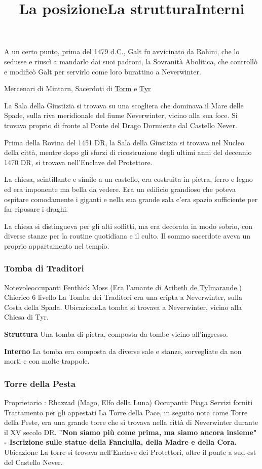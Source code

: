 \documentclass{article}
\begin{document}
A un certo punto, prima del 1479 d.C., Galt fu avvicinato da Rohini, che lo sedusse e riuscì a mandarlo dai suoi padroni, la Sovranità Abolitica, che controllò e modificò Galt per servirlo come loro burattino a Neverwinter.


Mercenari di Mintarn, Sacerdoti di \href{https://forgottenrealms.fandom.com/wiki/Torm}{Torm} e \href{https://forgottenrealms.fandom.com/wiki/Tyr}{Tyr}
\newline


\title{La posizione}\newline
La Sala della Giustizia si trovava su una scogliera che dominava il Mare delle Spade, sulla riva meridionale del fiume Neverwinter, vicino alla sua foce. Si trovava proprio di fronte al Ponte del Drago Dormiente dal Castello Never.

Prima della Rovina del 1451 DR, la Sala della Giustizia si trovava nel Nucleo della città, mentre dopo gli sforzi di ricostruzione degli ultimi anni del decennio 1470 DR, si trovava nell'Enclave del Protettore.\newline

\title{La struttura}
La chiesa, scintillante e simile a un castello, era costruita in pietra, ferro e legno ed era imponente ma bella da vedere. Era un edificio grandioso che poteva ospitare comodamente i giganti e nella sua grande sala c'era spazio sufficiente per far riposare i draghi.\newline
\title{Interni}
La chiesa si distingueva per gli alti soffitti, ma era decorata in modo sobrio, con diverse stanze per la routine quotidiana e il culto. Il sommo sacerdote aveva un proprio appartamento nel tempio.
              \subsubsection{Tomba di Traditori }
Notevoleoccupanti
Fenthick Moss (Era l'amante di \href{https://forgottenrealms.fandom.com/wiki/Aribeth_de_Tylmarande}{Aribeth de Tylmarande.}) Chierico 6 livello
La Tomba dei Traditori era una cripta a Neverwinter, sulla Costa della Spada.
UbicazioneLa tomba si trovava a Neverwinter, vicino alla Chiesa di Tyr.

\textbf{Struttura}
Una tomba di pietra, composta da tombe vicino all'ingresso.

\textbf{Interno}
La tomba era composta da diverse sale e stanze, sorvegliate da non morti e con molte trappole.
              \subsubsection{Torre della Pesta}
Proprietario : Rhazzad (Mago, Elfo della Luna) \newline
Occupanti: Piaga \newline
Servizi forniti
Trattamento per gli appestati
La Torre della Pace, in seguito nota come Torre della Peste, era una grande torre che si trovava nella città di Neverwinter durante il XV secolo DR.
\textbf{"Non siamo più come prima, ma siamo ancora insieme"
- Iscrizione sulle statue della Fanciulla, della Madre e della Cora.}
Ubicazione\newline
La torre si trovava nell'Enclave dei Protettori, oltre il ponte a sud-est del Castello Never.
\end{document}
